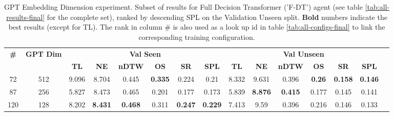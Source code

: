 \begin{table}
\centering
\caption{\label{tab:f_dt_dim_test}GPT Embedding Dimension experiment. Subset of results for Full Decision Transformer ('F-DT') agent (see table \ref{tab:all-results-final} for the complete set), ranked by descending SPL on the Validation Unseen split. \textbf{Bold} numbers indicate the best results (except for TL). The rank in column \# is also used as a look up id in table \ref{tab:all-configs-final} to link the corresponding training configuration.}
\begin{tabular}{@{\hskip3pt}c@{\hskip3pt}c@{\hskip3pt}c@{\hskip3pt}c@{\hskip3pt}c@{\hskip3pt}c@{\hskip3pt}c@{\hskip3pt}c@{\hskip3pt}c@{\hskip3pt}c@{\hskip3pt}c@{\hskip3pt}c@{\hskip3pt}c@{\hskip3pt}c@{\hskip3pt}c}
\toprule
                                  \textbf{\#} & \textbf{GPT Dim} & \multicolumn{6}{c}{\textbf{Val Seen}} & \multicolumn{6}{c}{\textbf{Val Unseen}} \\
\cmidrule(l){3-8}\cmidrule(l){9-14}\textbf{~} &       \textbf{~} &       \textbf{TL} &     \textbf{NE} &   \textbf{nDTW} &     \textbf{OS} &     \textbf{SR} &    \textbf{SPL} &         \textbf{TL} &     \textbf{NE} &   \textbf{nDTW} &    \textbf{OS} &     \textbf{SR} &    \textbf{SPL} \\
\midrule
                                           72 &              512 &             9.096 &           8.704 &           0.445 &  \textbf{0.335} &           0.224 &            0.21 &               8.332 &           9.631 &           0.396 &  \textbf{0.26} &  \textbf{0.158} &  \textbf{0.146} \\
                                           87 &              256 &             5.827 &           8.473 &           0.465 &           0.201 &           0.177 &           0.173 &               5.839 &  \textbf{8.876} &  \textbf{0.415} &          0.177 &           0.145 &           0.141 \\
                                          120 &              128 &             8.202 &  \textbf{8.431} &  \textbf{0.468} &           0.311 &  \textbf{0.247} &  \textbf{0.229} &               7.413 &            9.59 &           0.396 &          0.216 &           0.146 &           0.133 \\
\bottomrule
\end{tabular}
\end{table}
